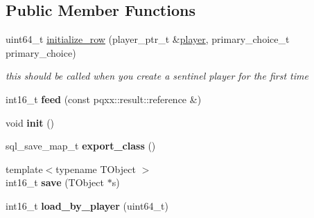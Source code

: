 \subsection*{Public Member Functions}
\begin{DoxyCompactItemize}
\item 
uint64\+\_\+t \hyperlink{structmods_1_1orm_1_1sentinel_aa01c7770d384a6461a7d886e1ac94d03}{initialize\+\_\+row} (player\+\_\+ptr\+\_\+t \&\hyperlink{classmods_1_1player}{player}, primary\+\_\+choice\+\_\+t primary\+\_\+choice)
\begin{DoxyCompactList}\small\item\em this should be called when you create a sentinel player for the first time \end{DoxyCompactList}\item 
\mbox{\label{structmods_1_1orm_1_1sentinel_a5ecb7826ac778ce46553d5e2ddc1e1ce}} 
int16\+\_\+t {\bfseries feed} (const pqxx\+::result\+::reference \&)
\item 
\mbox{\label{structmods_1_1orm_1_1sentinel_a647d47550ba7a701db859ae345ed4961}} 
void {\bfseries init} ()
\item 
\mbox{\label{structmods_1_1orm_1_1sentinel_a92fab6f75026a8f32d4e247fdb354fe1}} 
sql\+\_\+save\+\_\+map\+\_\+t {\bfseries export\+\_\+class} ()
\item 
\mbox{\label{structmods_1_1orm_1_1sentinel_a489399f341134b33a89e641824852de7}} 
{\footnotesize template$<$typename T\+Object $>$ }\\int16\+\_\+t {\bfseries save} (T\+Object $\ast$s)
\item 
\mbox{\label{structmods_1_1orm_1_1sentinel_ae6255e3f50d7301ccc28fd42c4821e45}} 
int16\+\_\+t {\bfseries load\+\_\+by\+\_\+player} (uint64\+\_\+t)
\end{DoxyCompactItemize}
